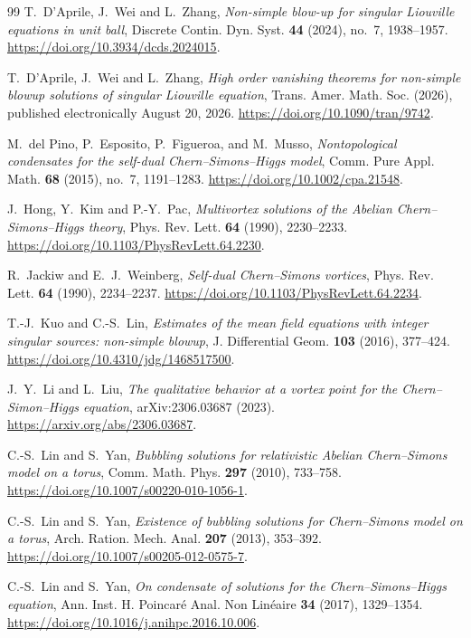 \documentclass[11pt,reqno]{amsart}
\numberwithin{equation}{section}
\theoremstyle{definition}
\theoremstyle{remark}
\begin{document}
\begin{thebibliography}{99}
T.~D'Aprile, J.~Wei and L.~Zhang,
\emph{Non-simple blow-up for singular Liouville equations in unit ball},
Discrete Contin. Dyn. Syst. \textbf{44} (2024), no.~7, 1938--1957.
\url{https://doi.org/10.3934/dcds.2024015}.

T.~D'Aprile, J.~Wei and L.~Zhang,
\emph{High order vanishing theorems for non-simple blowup solutions of
singular Liouville equation},
Trans. Amer. Math. Soc. (2026), published electronically August 20, 2026.
\url{https://doi.org/10.1090/tran/9742}.

M.~del Pino, P.~Esposito, P.~Figueroa, and M.~Musso,
\emph{Nontopological condensates for the self-dual Chern--Simons--Higgs model},
Comm. Pure Appl. Math. \textbf{68} (2015), no.~7, 1191--1283.
\url{https://doi.org/10.1002/cpa.21548}.

J.~Hong, Y.~Kim and P.-Y.~Pac,
\emph{Multivortex solutions of the Abelian Chern--Simons--Higgs theory},
Phys. Rev. Lett. \textbf{64} (1990), 2230--2233.
\url{https://doi.org/10.1103/PhysRevLett.64.2230}.

R.~Jackiw and E.~J.~Weinberg,
\emph{Self-dual Chern--Simons vortices},
Phys. Rev. Lett. \textbf{64} (1990), 2234--2237.
\url{https://doi.org/10.1103/PhysRevLett.64.2234}.

T.-J.~Kuo and C.-S.~Lin,
\emph{Estimates of the mean field equations with integer singular sources:
non-simple blowup},
J. Differential Geom. \textbf{103} (2016), 377--424.
\url{https://doi.org/10.4310/jdg/1468517500}.

J.~Y.~Li and L.~Liu,
\emph{The qualitative behavior at a vortex point for the Chern--Simon--Higgs equation},
arXiv:2306.03687 (2023).
\url{https://arxiv.org/abs/2306.03687}.

C.-S.~Lin and S.~Yan,
\emph{Bubbling solutions for relativistic Abelian Chern--Simons model on a torus},
Comm. Math. Phys. \textbf{297} (2010), 733--758.
\url{https://doi.org/10.1007/s00220-010-1056-1}.

C.-S.~Lin and S.~Yan,
\emph{Existence of bubbling solutions for Chern--Simons model on a torus},
Arch. Ration. Mech. Anal. \textbf{207} (2013), 353--392.
\url{https://doi.org/10.1007/s00205-012-0575-7}.

C.-S.~Lin and S.~Yan,
\emph{On condensate of solutions for the Chern--Simons--Higgs equation},
Ann. Inst. H. Poincar\'e Anal. Non Lin\'eaire \textbf{34} (2017), 1329--1354.
\url{https://doi.org/10.1016/j.anihpc.2016.10.006}.


\end{thebibliography}
\end{document}
